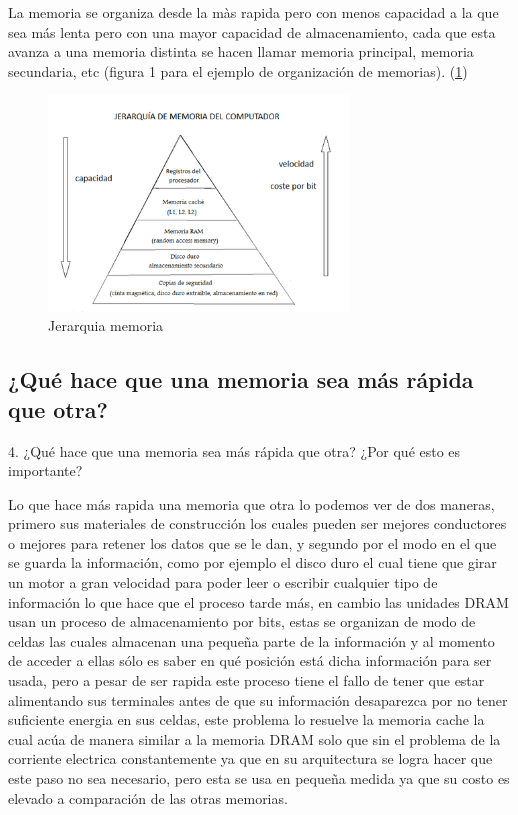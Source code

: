 \documentclass{article}
\begin{document}
\vspace{7cm}

La memoria se organiza desde la màs rapida pero con menos capacidad a la que sea más lenta pero con una mayor capacidad de almacenamiento, cada que esta avanza a una memoria distinta se hacen llamar memoria principal, memoria secundaria, etc (figura 1 para el ejemplo de organización de memorias).
(\ref{fig:cpplogo})

\begin{figure}[h]
\includegraphics[width=8cm]{Jerarquia de la memoria.png}
\centering
\caption{Jerarquia memoria}
\label{fig:cpplogo}
\end{figure}

\subsection{¿Qué hace que una memoria sea más rápida que otra?}
4. ¿Qué hace que una memoria sea más rápida que otra? ¿Por qué esto es importante?\vspace{0.5cm}




Lo que hace más rapida una memoria que otra lo podemos ver de dos maneras, primero sus materiales de construcción los cuales pueden ser mejores conductores o mejores para retener  los datos que se le dan, y segundo por el modo en el que se guarda la información, como por ejemplo el disco duro el cual tiene que girar un motor a gran velocidad para poder leer o escribir cualquier tipo de información lo que hace que el proceso tarde más, en cambio las unidades DRAM usan un proceso de almacenamiento por bits, estas se organizan de modo de celdas las cuales almacenan una pequeña parte de la información y al momento de acceder a ellas sólo es saber en qué posición está dicha información para ser usada, pero a pesar de ser rapida este proceso tiene el fallo de tener que estar alimentando sus terminales antes de que su información desaparezca por no tener suficiente energia en sus celdas, este problema lo resuelve la memoria cache la cual acúa de manera similar a la memoria DRAM solo que sin el problema de la corriente electrica constantemente ya que en su arquitectura se logra hacer que este paso no sea necesario, pero esta se usa en pequeña medida ya que su costo es elevado a comparación de las otras memorias.
\end{document}
